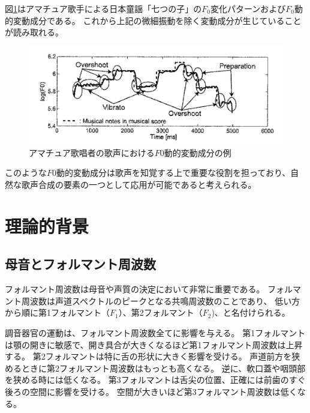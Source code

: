 \documentclass[10ptj,a4j,dvipdfmx,uplatex, oneside, openany]{jsbook}%
\begin{document}
図\ref{f0_moving}はアマチュア歌手による日本童謡「七つの子」の$F_0$変化パターンおよび$F_0$動的変動成分である。
これから上記の微細振動を除く変動成分が生じていることが読み取れる。

\begin{figure}[htbp]
    \begin{center}
      \includegraphics[clip,width=12.0cm]{f0_moving.png}
      \caption{アマチュア歌唱者の歌声における$F0$動的変動成分の例\cite{singbyspeaking}}
      \label{f0_moving}
    \end{center}
\end{figure}

このような$F0$動的変動成分は歌声を知覚する上で重要な役割を担っており、自然な歌声合成の要素の一つとして応用が可能であると考えられる。


\section{}


\chapter{理論的背景}
\section{母音とフォルマント周波数}
フォルマント周波数は母音や声質の決定において非常に重要である。
フォルマント周波数は声道スペクトルのピークとなる共鳴周波数のことであり、
低い方から順に第1フォルマント（$F_1$）、第2フォルマント（$F_2$)、と名付けられる。

調音器官の運動は、フォルマント周波数全てに影響を与える。
第1フォルマントは顎の開きに敏感で、開き具合が大きくなるほど第1フォルマント周波数は上昇する。
第2フォルマントは特に舌の形状に大きく影響を受ける。
声道前方を狭めるときに第2フォルマント周波数はもっとも高くなる。
逆に、軟口蓋や咽頭部を狭める時には低くなる。
第3フォルマントは舌尖の位置、正確には前歯のすぐ後ろの空間に影響を受ける。
空間が大きいほど第3フォルマント周波数は低くなる。
\end{document}
